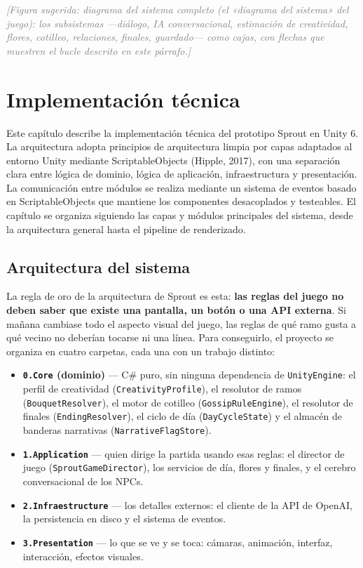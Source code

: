 \documentclass[12pt,twoside,titlepage]{report}
\begin{document}
\textcolor{gray}{\textit{[Figura sugerida: diagrama del sistema completo (el «diagrama del sistema» del juego): los subsistemas ---diálogo, IA conversacional, estimación de creatividad, flores, cotilleo, relaciones, finales, guardado--- como cajas, con flechas que muestren el bucle descrito en este párrafo.]}}

\chapter{Implementación técnica}

Este capítulo describe la implementación técnica del prototipo Sprout en Unity 6. La arquitectura adopta principios de arquitectura limpia por capas adaptados al entorno Unity mediante ScriptableObjects (Hipple, 2017), con una separación clara entre lógica de dominio, lógica de aplicación, infraestructura y presentación. La comunicación entre módulos se realiza mediante un sistema de eventos basado en ScriptableObjects que mantiene los componentes desacoplados y testeables. El capítulo se organiza siguiendo las capas y módulos principales del sistema, desde la arquitectura general hasta el pipeline de renderizado.
\section{Arquitectura del sistema}

La regla de oro de la arquitectura de Sprout es esta: \textbf{las reglas del juego no deben saber que existe una pantalla, un botón o una API externa}. Si mañana cambiase todo el aspecto visual del juego, las reglas de qué ramo gusta a qué vecino no deberían tocarse ni una línea. Para conseguirlo, el proyecto se organiza en cuatro carpetas, cada una con un trabajo distinto:

\begin{itemize}
  \item \textbf{\texttt{0.Core} (dominio)} --- C\# puro, sin ninguna dependencia de \texttt{UnityEngine}: el perfil de creatividad (\texttt{CreativityProfile}), el resolutor de ramos (\texttt{BouquetResolver}), el motor de cotilleo (\texttt{GossipRuleEngine}), el resolutor de finales (\texttt{EndingResolver}), el ciclo de día (\texttt{DayCycleState}) y el almacén de banderas narrativas (\texttt{NarrativeFlagStore}).
  \item \textbf{\texttt{1.Application}} --- quien dirige la partida usando esas reglas: el director de juego (\texttt{SproutGameDirector}), los servicios de día, flores y finales, y el cerebro conversacional de los NPCs.
  \item \textbf{\texttt{2.Infraestructure}} --- los detalles externos: el cliente de la API de OpenAI, la persistencia en disco y el sistema de eventos.
  \item \textbf{\texttt{3.Presentation}} --- lo que se ve y se toca: cámaras, animación, interfaz, interacción, efectos visuales.
\end{itemize}
\end{document}
